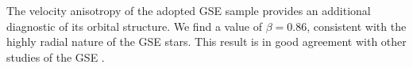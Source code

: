 \documentclass[twocolumn,tighten,twocolappendix]{aastex701}
\begin{document}
The velocity anisotropy of the adopted GSE sample provides an additional diagnostic of its orbital structure. We find a value of $\beta=0.86$, consistent with the highly radial nature of the GSE stars. This result is in good agreement with other studies of the GSE \citep{2018ApJ...862L...1D, 2018ApJ...856L..26M, 2019MNRAS.486..378L, 2019ApJ...874....3N, 2021MNRAS.502.5686I, 2021ApJ...923...92N}.

\vfill\null


\end{document}
